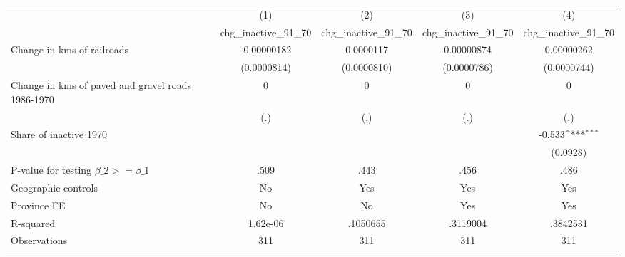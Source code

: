 {
\def\sym#1{\ifmmode^{#1}\else\(^{#1}\)\fi}
\begin{tabular}{l*{4}{c}}
\hline\hline
                &\multicolumn{1}{c}{(1)}&\multicolumn{1}{c}{(2)}&\multicolumn{1}{c}{(3)}&\multicolumn{1}{c}{(4)}\\
                &\multicolumn{1}{c}{chg\_inactive\_91\_70}&\multicolumn{1}{c}{chg\_inactive\_91\_70}&\multicolumn{1}{c}{chg\_inactive\_91\_70}&\multicolumn{1}{c}{chg\_inactive\_91\_70}\\
\hline
Change in kms of railroads&-0.00000182         &0.0000117         &0.00000874         &0.00000262         \\
                &(0.0000814)         &(0.0000810)         &(0.0000786)         &(0.0000744)         \\
[1em]
Change in kms of paved and gravel roads 1986-1970&        0         &        0         &        0         &        0         \\
                &      (.)         &      (.)         &      (.)         &      (.)         \\
[1em]
Share of inactive 1970&                  &                  &                  &   -0.533\sym{***}\\
                &                  &                  &                  & (0.0928)         \\
\hline
P-value for testing $\beta\_{2} >= \beta\_{1}$&     .509         &     .443         &     .456         &     .486         \\
Geographic controls&       No         &      Yes         &      Yes         &      Yes         \\
Province FE     &       No         &       No         &      Yes         &      Yes         \\
R-squared       & 1.62e-06         & .1050655         & .3119004         & .3842531         \\
Observations    &      311         &      311         &      311         &      311         \\
\hline\hline
\end{tabular}
}
